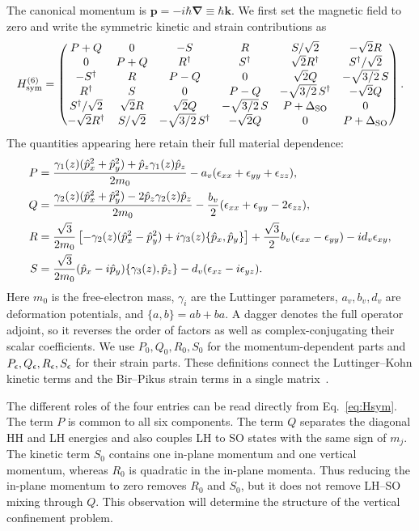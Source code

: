 The canonical momentum is $\bm p=-i\hbar\bm\nabla\equiv\hbar\bm k$. We first set the magnetic field to zero and write the symmetric kinetic and strain contributions as
\begin{equation}
H_{\mathrm{sym}}^{(6)}=
\begin{pmatrix}
P+Q&0&-S&R&S/\sqrt2&-\sqrt2R\\
0&P+Q&R^\dagger&S^\dagger&\sqrt2R^\dagger&S^\dagger/\sqrt2\\
-S^\dagger&R&P-Q&0&\sqrt2Q&-\sqrt{3/2}\,S\\
R^\dagger&S&0&P-Q&-\sqrt{3/2}\,S^\dagger&-\sqrt2Q\\
S^\dagger/\sqrt2&\sqrt2R&\sqrt2Q&-\sqrt{3/2}\,S&P+\Delta_{\mathrm{SO}}&0\\
-\sqrt2R^\dagger&S/\sqrt2&-\sqrt{3/2}\,S^\dagger&-\sqrt2Q&0&P+\Delta_{\mathrm{SO}}
\end{pmatrix}.
\label{eq:Hsym}
\end{equation}
The quantities appearing here retain their full material dependence:
\begin{align}
P={}&\frac{\gamma_1(z)( \hat{p}_ x^2+ \hat{p}_ y^2)+ \hat{p}_ z\gamma_1(z) \hat{p}_ z}{2m_0}
-a_v(\epsilon_ {xx}+\epsilon_ {yy}+\epsilon_ {zz}),\label{eq:P}\\
Q={}&\frac{\gamma_2(z)( \hat{p}_ x^2+ \hat{p}_ y^2)-2 \hat{p}_ z\gamma_2(z) \hat{p}_ z}{2m_0}
-\frac{b_v}{2}(\epsilon_ {xx}+\epsilon_ {yy}-2\epsilon_ {zz}),\label{eq:Q}\\
R={}&\frac{\sqrt3}{2m_0}\left[-\gamma_2(z)( \hat{p}_ x^2- \hat{p}_ y^2)
+i\gamma_3(z)\{ \hat{p}_ x, \hat{p}_ y\}\right]
+\frac{\sqrt3}{2}b_v(\epsilon_ {xx}-\epsilon_ {yy})-id_v\epsilon_ {xy},\label{eq:R}\\
S={}&\frac{\sqrt3}{2m_0}( \hat{p}_ x-i \hat{p}_ y)\{\gamma_3(z), \hat{p}_ z\}
-d_v(\epsilon_ {xz}-i\epsilon_ {yz}).\label{eq:S}
\end{align}
Here $m_0$ is the free-electron mass, $\gamma_i$ are the Luttinger parameters, $a_v,b_v,d_v$ are deformation potentials, and $\{a,b\}=ab+ba$. A dagger denotes the full operator adjoint, so it reverses the order of factors as well as complex-conjugating their scalar coefficients. We use $P_0,Q_0,R_0,S_0$ for the momentum-dependent parts and $P_\epsilon,Q_\epsilon,R_\epsilon,S_\epsilon$ for their strain parts. These definitions connect the Luttinger--Kohn kinetic terms and the Bir--Pikus strain terms in a single matrix~\cite{luttingerkohn,birpikus,winkler}.

The different roles of the four entries can be read directly from Eq.~\eqref{eq:Hsym}. The term $P$ is common to all six components. The term $Q$ separates the diagonal HH and LH energies and also couples LH to SO states with the same sign of $m_j$. The kinetic term $S_0$ contains one in-plane momentum and one vertical momentum, whereas $R_0$ is quadratic in the in-plane momenta. Thus reducing the in-plane momentum to zero removes $R_0$ and $S_0$, but it does not remove LH--SO mixing through $Q$. This observation will determine the structure of the vertical confinement problem.

